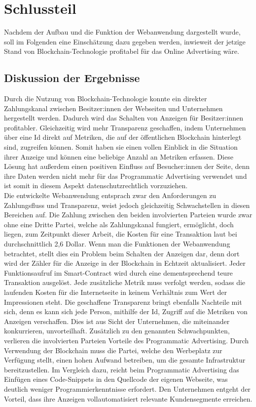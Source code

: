 \chapter{Schlussteil}
Nachdem der Aufbau und die Funktion der Webanwendung dargestellt wurde, soll im Folgenden eine Einschätzung dazu gegeben werden, inwieweit der jetzige Stand von Blockchain-Technologie profitabel für das Online Advertising wäre.
\section{Diskussion der Ergebnisse}
Durch die Nutzung von Blockchain-Technologie konnte ein direkter Zahlungskanal zwischen Besitzer:innen der Webseiten und Unternehmen hergestellt werden. Dadurch wird das Schalten von Anzeigen für Besitzer:innen profitabler. Gleichzeitig wird mehr Transparenz geschaffen, indem Unternehmen über eine Id direkt auf Metriken, die auf der öffentlichen Blockchain hinterlegt sind, zugreifen können. Somit haben sie einen vollen Einblick in die Situation ihrer Anzeige und können eine beliebige Anzahl an Metriken erfassen. Diese Lösung hat außerdem einen positiven Einfluss auf Besucher:innen der Seite, denn ihre Daten werden nicht mehr für das Programmatic Advertising verwendet und ist somit in diesem Aspekt datenschutzrechtlich vorzuziehen.\\

Die entwickelte Webanwendung entsprach zwar den Anforderungen zu Zahlungsfluss und Transparenz, weist jedoch gleichzeitig Schwachstellen in diesen Bereichen auf. Die Zahlung zwischen den beiden involvierten Parteien wurde zwar ohne eine Dritte Partei, welche als Zahlungskanal fungiert, ermöglicht, doch liegen, zum Zeitpunkt dieser Arbeit, die Kosten für eine Transaktion laut \cite{etherscan_2021} bei durchschnittlich 2,6 Dollar. Wenn man die Funktionen der Webanwendung betrachtet, stellt dies ein Problem beim Schalten der Anzeigen dar, denn dort wird der Zähler für die Anzeige in der Blockchain in Echtzeit aktualisiert. Jeder Funktionsaufruf im Smart-Contract wird durch eine dementsprechend teure Transaktion ausgelöst. Jede zusätzliche Metrik muss verfolgt werden, sodass die laufenden Kosten für die Internetseite in keinem Verhältnis zum Wert der Impressionen steht. 
Die geschaffene Transparenz bringt ebenfalls Nachteile mit sich, denn es kann sich jede Person, mithilfe der Id, Zugriff auf die Metriken von Anzeigen verschaffen. Dies ist aus Sicht der Unternehmen, die miteinander konkurrieren, unvorteilhaft. Zusätzlich zu den genannten Schwachpunkten, verlieren die involvierten Parteien Vorteile des Programmatic Advertising. Durch Verwendung der Blockchain muss die Partei, welche den Werbeplatz zur Verfügung stellt, einen hohen Aufwand betreiben, um die gesamte Infrastruktur bereitzustellen. Im Vergleich dazu, reicht beim Programmatic Advertising das Einfügen eines Code-Snippets in den Quellcode der eigenen Webseite, was deutlich weniger Programmierkenntnisse erfordert. Den Unternehmen entgeht der Vorteil, dass ihre Anzeigen vollautomatisiert relevante Kundensegmente erreichen.\\

